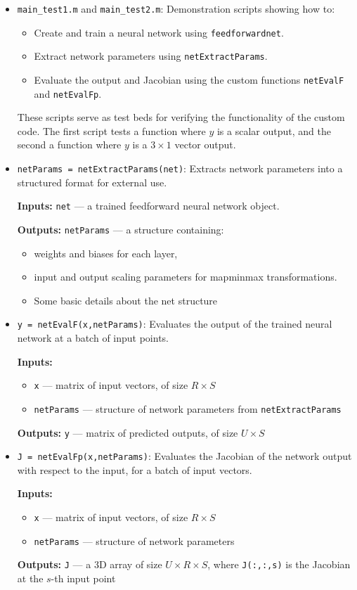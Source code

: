 \documentclass[a4paper,12pt]{article}
\newcommand{\code}[1]{\texttt{#1}}
\begin{document}
\begin{itemize}
  \item \code{main\_test1.m} and \code{main\_test2.m}:  
  Demonstration scripts showing how to:
  \begin{itemize}
    \item Create and train a neural network using \code{feedforwardnet}.
    \item Extract network parameters using \code{netExtractParams}.
    \item Evaluate the output and Jacobian using the custom functions \code{netEvalF} and \code{netEvalFp}.
  \end{itemize}
  These scripts serve as test beds for verifying the functionality of the custom code. The first script tests a function where $y$ is a scalar output, and the second a function where $y$ is a $3\times1$ vector output.

  \item \code{netParams = netExtractParams(net)}:  
  Extracts network parameters into a structured format for external use.

  \textbf{Inputs:} \code{net} — a trained feedforward neural network object.

  \textbf{Outputs:} \code{netParams} — a structure containing:
  \begin{itemize}
    \item weights and biases for each layer,
    \item input and output scaling parameters for mapminmax transformations.
    \item Some basic details about the net structure
  \end{itemize}

  \item \code{y = netEvalF(x,netParams)}:  
  Evaluates the output of the trained neural network at a batch of input points.

  \textbf{Inputs:}
  \begin{itemize}
    \item \code{x} — matrix of input vectors, of size \( R \times S \)
    \item \code{netParams} — structure of network parameters from \code{netExtractParams}
  \end{itemize}

  \textbf{Outputs:} \code{y} — matrix of predicted outputs, of size \( U \times S \)

  \item \code{J = netEvalFp(x,netParams)}:  
  Evaluates the Jacobian of the network output with respect to the input, for a batch of input vectors.

  \textbf{Inputs:}
  \begin{itemize}
    \item \code{x} — matrix of input vectors, of size \( R \times S \)
    \item \code{netParams} — structure of network parameters
  \end{itemize}

  \textbf{Outputs:} \code{J} — a 3D array of size \( U \times R \times S \), where \code{J(:,:,s)} is the Jacobian at the \( s \)-th input point
\end{itemize}
\end{document}
